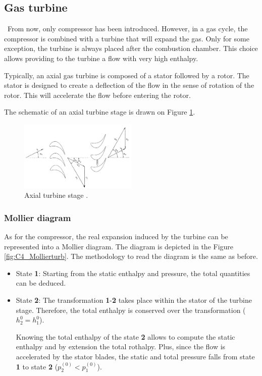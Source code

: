\subsection{Gas turbine}
\quad\ From now, only compressor has been introduced. However, in a gas cycle, the compressor is combined with a turbine that will expand the gas. Only for some exception, the turbine is always placed after the combustion chamber. This choice allows providing to the turbine a flow with very high enthalpy.

Typically, an axial gas turbine is composed of a stator followed by a rotor. The stator is designed to create a deflection of the flow in the sense of rotation of the rotor. This will accelerate the flow before entering the rotor.

The schematic of an axial turbine stage is drawn on Figure \ref{fig:C4_turbstage}.
\begin{figure}[h]
    \centering
    \includegraphics[width=0.5\textwidth]{Turb_stage.png}
    \caption{Axial turbine stage \cite{Hillewaert2019}.}
    \label{fig:C4_turbstage}
\end{figure}
\subsubsection{Mollier diagram}
As for the compressor, the real expansion induced by the turbine can be represented into a Mollier diagram. The diagram is depicted in the Figure \ref{fig:C4_Mollierturb}. The methodology to read the diagram is the same as before.


\begin{itemize}
    \item State \textbf{1}: Starting from the static enthalpy and pressure, the total quantities can be deduced.
    \item State \textbf{2}: The transformation \textbf{1}-\textbf{2} takes place within the stator of the turbine stage. Therefore, the total enthalpy is conserved over the transformation ($h_2^0=h_1^0$).

    Knowing the total enthalpy of the state \textbf{2} allows to compute the static enthalpy and by extension the total rothalpy. Plus, since the flow is accelerated by the stator blades, the static and total pressure falls from state \textbf{1} to state \textbf{2} (\(p_2^{(0)}<p_1^{(0)}\)).
\end{itemize}

